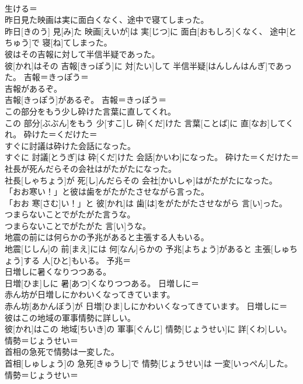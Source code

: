 \documentclass[8pt]{extreport}
\begin{document}
\begin{CJK}{UTF8}{min}
\\	生ける＝ 
\\	昨日見た映画は実に面白くなく、途中で寝てしまった。	
\\	昨日[きのう] 見[み]た 映画[えいが]は 実[じつ]に 面白[おもしろ]くなく、 途中[とちゅう]で 寝[ね]てしまった。	
\\	彼はその吉報に対して半信半疑であった。	
\\	彼[かれ]はその 吉報[きっぽう]に 対[たい]して 半信半疑[はんしんはんぎ]であった。	吉報＝きっぽう＝ 
\\	吉報があるぞ。	
\\	吉報[きっぽう]があるぞ。	吉報＝きっぽう＝ 
\\	この部分をもう少し砕けた言葉に直してくれ。	
\\	この 部分[ぶぶん]をもう 少[すこ]し 砕[くだ]けた 言葉[ことば]に 直[なお]してくれ。	砕けた＝くだけた＝ 
\\	すぐに討議は砕けた会話になった。	
\\	すぐに 討議[とうぎ]は 砕[くだ]けた 会話[かいわ]になった。	砕けた＝くだけた＝ 
\\	社長が死んだらその会社はがたがたになった。	
\\	社長[しゃちょう]が 死[し]んだらその 会社[かいしゃ]はがたがたになった。	
\\	「おお寒い！」と彼は歯をがたがたさせながら言った。	
\\	「おお 寒[さむ]い！」と 彼[かれ]は 歯[は]をがたがたさせながら 言[い]った。	
\\	つまらないことでがたがた言うな。	
\\	つまらないことでがたがた 言[い]うな。	
\\	地震の前には何らかの予兆があると主張する人もいる。	
\\	地震[じしん]の 前[まえ]には 何[なん]らかの 予兆[よちょう]があると 主張[しゅちょう]する 人[ひと]もいる。	予兆＝ 
\\	日増しに暑くなりつつある。	
\\	日増[ひま]しに 暑[あつ]くなりつつある。	日増しに＝ 
\\	赤ん坊が日増しにかわいくなってきています。	
\\	赤ん坊[あかんぼう]が 日増[ひま]しにかわいくなってきています。	日増しに＝ 
\\	彼はこの地域の軍事情勢に詳しい。	
\\	彼[かれ]はこの 地域[ちいき]の 軍事[ぐんじ] 情勢[じょうせい]に 詳[くわ]しい。	情勢＝じょうせい＝ 
\\	首相の急死で情勢は一変した。	
\\	首相[しゅしょう]の 急死[きゅうし]で 情勢[じょうせい]は 一変[いっぺん]した。	情勢＝じょうせい＝ 

\end{CJK}
\end{document}

